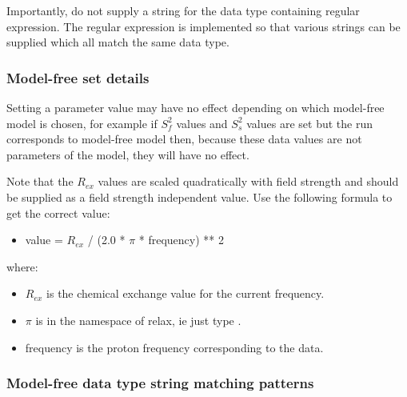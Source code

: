 Importantly, do not supply a string for the data type containing regular expression.  The regular expression is implemented so that various strings can be supplied which all match the same data type.



\subsubsection{Model-free set details}

Setting a parameter value may have no effect depending on which model-free model is chosen, for example if $S^2_f$ values and $S^2_s$ values are set but the run corresponds to model-free model  then, because these data values are not parameters of the model, they will have no effect.


Note that the $R_{ex}$ values are scaled quadratically with field strength and should be supplied as a field strength independent value.  Use the following formula to get the correct value:


\begin{itemize}
\item[] value = $R_{ex}$ / (2.0 * $\pi$ * frequency) ** 2 
\end{itemize}


where:


\begin{itemize}
\item[] $R_{ex}$ is the chemical exchange value for the current frequency. 
\item[] $\pi$ is in the namespace of relax, ie just type \quotecmd{$\pi$}. 
\item[] frequency is the proton frequency corresponding to the data. 
\end{itemize}



\subsubsection{Model-free data type string matching patterns}


